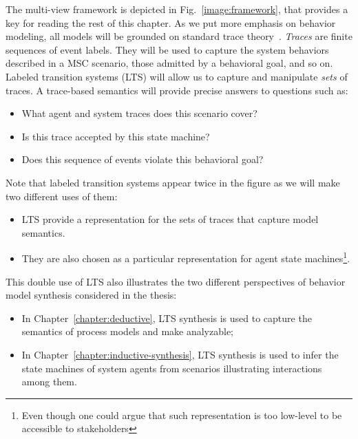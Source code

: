 The multi-view framework is depicted in Fig.~\ref{image:framework}, that provides a key for reading the rest of this chapter. As we put more emphasis on behavior modeling, all models will be grounded on standard trace theory~\cite{Hoare:1985}. \emph{Traces} are finite sequences of event labels. They will be used to capture the system behaviors described in a MSC scenario, those admitted by a behavioral goal, and so on. Labeled transition systems (LTS) will allow us to capture and manipulate \emph{sets} of traces. A trace-based semantics will provide precise answers to questions such as:
\begin{itemize} 
\item What agent and system traces does this scenario cover?
\item Is this trace accepted by this state machine?
\item Does this sequence of events violate this behavioral goal?
\end{itemize}

Note that labeled transition systems appear twice in the figure as we will make two different uses of them:
\begin{itemize} 
\item LTS provide a representation for the sets of traces that capture model semantics. 
\item They are also chosen as a particular representation for agent state machines\footnote{Even though one could argue that such representation is too low-level to be accessible to stakeholders}.
\end{itemize}

This double use of LTS also illustrates the two different perspectives of behavior model synthesis considered in the thesis:
\begin{itemize}
\item In Chapter~\ref{chapter:deductive}, LTS synthesis is used to capture the semantics of process models and make analyzable;
\item In Chapter~\ref{chapter:inductive-synthesis}, LTS synthesis is used to infer the state machines of system agents from scenarios illustrating interactions among them.
\end{itemize}

